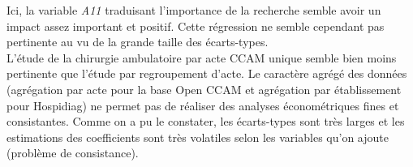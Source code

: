 \clearpage

Ici, la variable \textit{A11} traduisant l'importance de la recherche semble avoir un impact assez important et positif. Cette régression ne semble cependant pas pertinente au vu de la grande taille des écarts-types.\\

L'étude de la chirurgie ambulatoire par acte CCAM unique semble bien moins pertinente que l'étude par regroupement d'acte. Le caractère agrégé des données (agrégation par acte pour la base Open CCAM et agrégation par établissement pour Hospidiag) ne permet pas de réaliser des analyses économétriques fines et consistantes. Comme on a pu le constater, les écarts-types sont très larges et les estimations des coefficients sont très volatiles selon les variables qu'on ajoute (problème de consistance).\\

